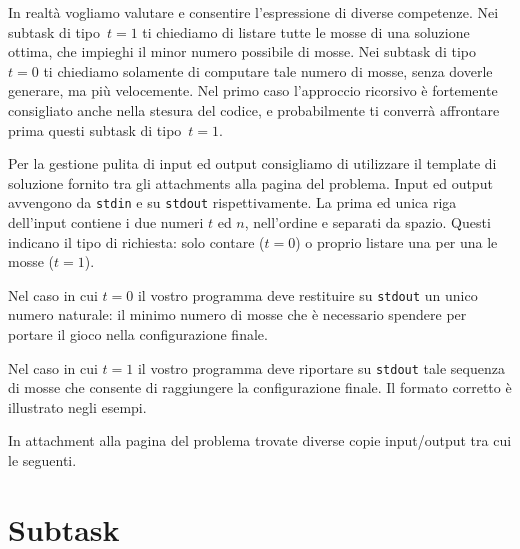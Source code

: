 In realtà vogliamo valutare e consentire l'espressione di diverse competenze. Nei subtask di tipo~$t=1$ ti chiediamo di listare tutte le mosse di una soluzione ottima, che impieghi il minor numero possibile di mosse.
Nei subtask di tipo~$t=0$ ti chiediamo solamente di computare tale numero di mosse, senza doverle generare, ma più velocemente.
Nel primo caso l'approccio ricorsivo è fortemente consigliato anche nella stesura del codice, e probabilmente ti converrà affrontare prima questi subtask di tipo~$t=1$.



Per la gestione pulita di input ed output consigliamo di utilizzare il template di soluzione fornito tra gli attachments alla pagina del problema.
Input ed output avvengono da \verb'stdin' e su \verb'stdout' rispettivamente.
La prima ed unica riga dell'input contiene i due numeri $t$ ed $n$, nell'ordine e separati da spazio. Questi indicano il tipo di richiesta: solo contare ($t=0$) o proprio listare una per una le mosse ($t=1$).

\indent
Nel caso in cui $t=0$ il vostro programma deve restituire su \verb'stdout' un unico numero naturale: il minimo numero di mosse che è necessario spendere per portare il gioco nella configurazione finale.

\indent
Nel caso in cui $t= 1$ il vostro programma deve riportare su \verb'stdout' tale sequenza di mosse che consente di raggiungere la configurazione finale. Il formato corretto è illustrato negli esempi.



In attachment alla pagina del problema trovate diverse copie input/output tra cui le seguenti.


\vspace{0.5cm}

\vspace{0.5cm}

\vspace{0.5cm}



\section*{Subtask}

